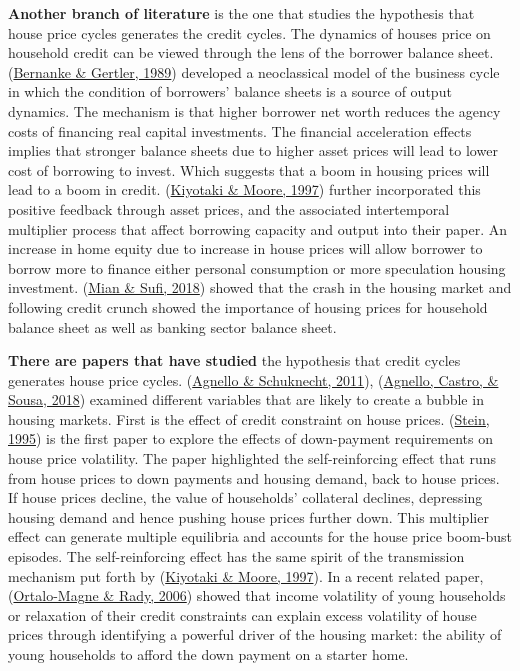 \documentclass[
  12pt,
]{article}
\begin{document}
\textbf{Another branch of literature} is the one that studies the hypothesis that house price cycles generates the credit cycles. The dynamics of houses price on household credit can be viewed through the lens of the borrower balance sheet. (\protect\hyperlink{ref-bernanke_agency_1989}{Bernanke \& Gertler, 1989}) developed a neoclassical model of the business cycle in which the condition of borrowers' balance sheets is a source of output dynamics. The mechanism is that higher borrower net worth reduces the agency costs of financing real capital investments. The financial acceleration effects implies that stronger balance sheets due to higher asset prices will lead to lower cost of borrowing to invest. Which suggests that a boom in housing prices will lead to a boom in credit. (\protect\hyperlink{ref-kiyotaki_credit_1997}{Kiyotaki \& Moore, 1997}) further incorporated this positive feedback through asset prices, and the associated intertemporal multiplier process that affect borrowing capacity and output into their paper. An increase in home equity due to increase in house prices will allow borrower to borrow more to finance either personal consumption or more speculation housing investment. (\protect\hyperlink{ref-mian_credit_2018}{Mian \& Sufi, 2018}) showed that the crash in the housing market and following credit crunch showed the importance of housing prices for household balance sheet as well as banking sector balance sheet.

\textbf{There are papers that have studied} the hypothesis that credit cycles generates house price cycles. (\protect\hyperlink{ref-agnello_booms_2011}{Agnello \& Schuknecht, 2011}), (\protect\hyperlink{ref-agnello_economic_2018}{Agnello, Castro, \& Sousa, 2018}) examined different variables that are likely to create a bubble in housing markets. First is the effect of credit constraint on house prices. (\protect\hyperlink{ref-stein_prices_1995}{Stein, 1995}) is the first paper to explore the effects of down-payment requirements on house price volatility. The paper highlighted the self-reinforcing effect that runs from house prices to down payments and housing demand, back to house prices. If house prices decline, the value of households' collateral declines, depressing housing demand and hence pushing house prices further down. This multiplier effect can generate multiple equilibria and accounts for the house price boom-bust episodes. The self-reinforcing effect has the same spirit of the transmission mechanism put forth by (\protect\hyperlink{ref-kiyotaki_credit_1997}{Kiyotaki \& Moore, 1997}). In a recent related paper, (\protect\hyperlink{ref-ortalo-magne_housing_2006}{Ortalo-Magne \& Rady, 2006}) showed that income volatility of young households or relaxation of their credit constraints can explain excess volatility of house prices through identifying a powerful driver of the housing market: the ability of young households to afford the down payment on a starter home.
\end{document}

